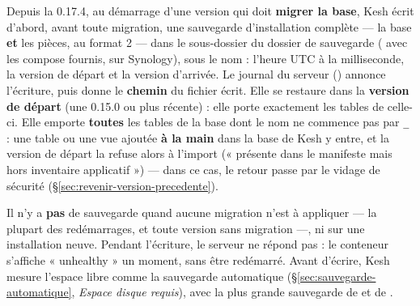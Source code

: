 \documentclass[a4paper,11pt,oneside]{article}
\begin{document}
Depuis la 0.17.4, au démarrage d'une version qui doit \textbf{migrer la base}, Kesh écrit d'abord, avant toute migration, une sauvegarde d'installation complète --- la base \textbf{et} les pièces, au format 2 --- dans le sous-dossier  du dossier de sauvegarde ( avec les compose fournis,  sur Synology), sous le nom  : l'heure UTC à la milliseconde, la version de départ et la version d'arrivée. Le journal du serveur () annonce l'écriture, puis donne le \textbf{chemin} du fichier écrit. Elle se restaure dans la \textbf{version de départ} (une 0.15.0 ou plus récente) : elle porte exactement les tables de celle-ci. Elle emporte \textbf{toutes} les tables de la base dont le nom ne commence pas par \texttt{\_} : une table ou une vue ajoutée \textbf{à la main} dans la base de Kesh y entre, et la version de départ la refuse alors à l'import (« présente dans le manifeste mais hors inventaire applicatif ») --- dans ce cas, le retour passe par le vidage de sécurité (\S\ref{sec:revenir-version-precedente}).

Il n'y a \textbf{pas} de sauvegarde quand aucune migration n'est à appliquer --- la plupart des redémarrages, et toute version sans migration ---, ni sur une installation neuve. Pendant l'écriture, le serveur ne répond pas : le conteneur s'affiche « unhealthy » un moment, sans être redémarré. Avant d'écrire, Kesh mesure l'espace libre comme la sauvegarde automatique (\S\ref{sec:sauvegarde-automatique}, \emph{Espace disque requis}), avec la plus grande sauvegarde de  et de .
\end{document}
